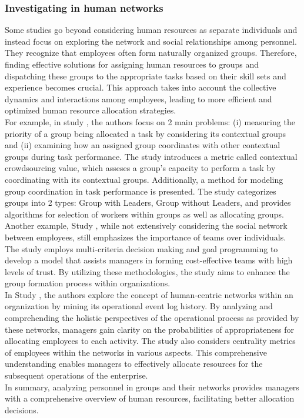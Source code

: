 \documentclass[runningheads]{llncs}
\begin{document}
\subsubsection{Investigating in human networks}
Some studies go beyond considering human resources as separate individuals and instead focus on exploring the network and social relationships among personnel. They recognize that employees often form naturally organized groups. Therefore, finding effective solutions for assigning human resources to groups and dispatching these groups to the appropriate tasks based on their skill sets and experience becomes crucial. This approach takes into account the collective dynamics and interactions among employees, leading to more efficient and optimized human resource allocation strategies.\\
For example, in study \cite{study19}, the authors focus on 2 main problems: (i) measuring the priority of a group being allocated a task by considering its contextual groups and (ii) examining how an assigned group coordinates with other contextual groups during task performance. The study introduces a metric called contextual crowdsourcing value, which asseses a group's capacity to perform a task by coordinating with its contextual groups. Additionally, a method for modeling group coordination in task performance is presented. The study categorizes groups into 2 types: Group with Leaders, Group without Leaders, and provides algorithms for selection of workers within groups as well as allocating groups.\\
Another example, Study \cite{study2}, while not extensively considering the social network between employees, still emphasizes the importance of teams over individuals. The study employs multi-criteria decision making and goal programming to develop a model that assists managers in forming cost-effective teams with high levels of trust. By utilizing these methodologies, the study aims to enhance the group formation process within organizations.\\
In Study \cite{study11}, the authors explore the concept of human-centric networks within an organization by mining its operational event log history. By analyzing and comprehending the holistic perspectives of the operational process as provided by these networks, managers gain clarity on the probabilities of appropriateness for allocating employees to each activity. The study also considers centrality metrics of employees within the networks in various aspects. This comprehensive understanding enables managers to effectively allocate resources for the subsequent operations of the enterprise.\\
In summary, analyzing personnel in groups and their networks provides managers with a comprehensive overview of human resources, facilitating better allocation decisions.
\end{document}
